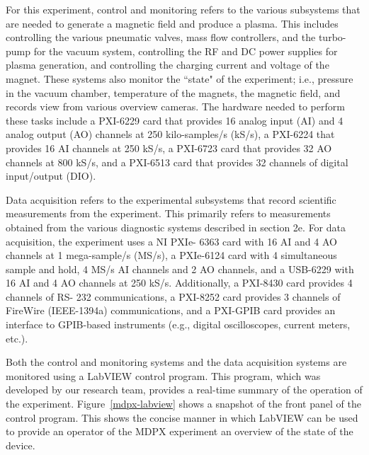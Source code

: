 For this experiment, control and monitoring refers to the various subsystems that are needed to generate a magnetic field and produce a plasma. This includes controlling the various pneumatic valves, mass flow controllers, and the turbo-pump for the vacuum system, controlling the RF and DC power supplies for plasma generation, and controlling the charging current and voltage of the magnet. These systems also monitor the ``state" of the experiment; i.e., pressure in the vacuum chamber, temperature of the magnets, the magnetic field, and records view from various overview cameras. The hardware needed to perform these tasks include a PXI-6229 card that provides 16 analog input (AI) and 4 analog output (AO) channels at 250 kilo-samples/s (kS/s), a PXI-6224 that provides 16 AI channels at 250 kS/s, a PXI-6723 card that provides 32 AO channels at 800 kS/s, and a PXI-6513 card that provides 32 channels of digital input/output (DIO).

Data acquisition refers to the experimental subsystems that record scientific measurements from the experiment. This primarily refers to measurements obtained from the various diagnostic systems described in section 2e. For data acquisition, the experiment uses a NI PXIe- 6363 card with 16 AI and 4 AO channels at 1 mega-sample/s (MS/s), a PXIe-6124 card with 4 simultaneous sample and hold, 4 MS/s AI channels and 2 AO channels, and a USB-6229 with 16 AI and 4 AO channels at 250 kS/s. Additionally, a PXI-8430 card provides 4 channels of RS- 232 communications, a PXI-8252 card provides 3 channels of FireWire (IEEE-1394a) communications, and a PXI-GPIB card provides an interface to GPIB-based instruments (e.g., digital oscilloscopes, current meters, etc.).

Both the control and monitoring systems and the data acquisition systems are monitored using a LabVIEW control program. This program, which was developed by our research team, provides a real-time summary of the operation of the experiment. Figure~\ref{mdpx-labview} shows a snapshot of the front panel of the control program. This shows the concise manner in which LabVIEW can be used to provide an operator of the MDPX experiment an overview of the state of the device.


